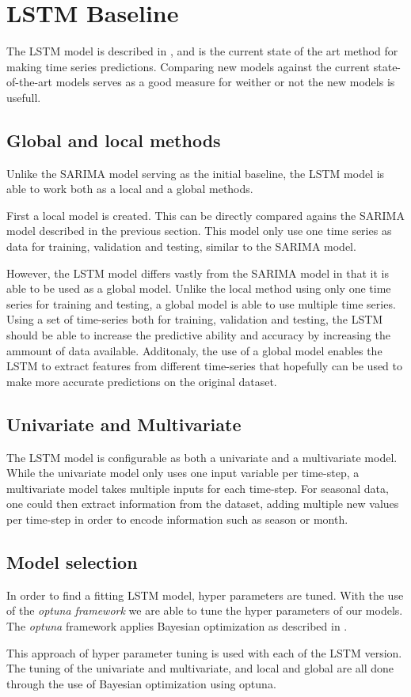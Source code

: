 
\section{LSTM Baseline}
\label{section:Architecture:Baselines:LSTM}

The LSTM model is described in , and is the current state of the art method for making time series predictions.
Comparing new models against the current state-of-the-art models serves as a good measure for weither or not the new models is usefull.

\subsection{Global and local methods}
Unlike the SARIMA model serving as the initial baseline,
the LSTM model is able to work both as a local and a global methods.

First a local model is created. This can be directly compared agains the SARIMA model described in the previous section.
This model only use one time series as data for training, validation and testing, similar to the SARIMA model.

However, the LSTM model differs vastly from the SARIMA model in that it is able to be used as a global model.
Unlike the local method using only one time series for training and testing,
a global model is able to use multiple time series.
Using a set of time-series both for training, validation and testing,
the LSTM should be able to increase the predictive ability and accuracy by increasing the ammount of data available.
Additonaly, the use of a global model enables the LSTM to extract features from different time-series that hopefully can be used to make more accurate predictions on the original dataset.

\subsection{Univariate and Multivariate}
The LSTM model is configurable as both a univariate and a multivariate model.
While the univariate model only uses one input variable per time-step, a multivariate model takes multiple inputs for each time-step.
For seasonal data, one could then extract information from the dataset, adding multiple new values per time-step in order to encode information such as season or month.

\subsection{Model selection}
In order to find a fitting LSTM model, hyper parameters are tuned.
With the use of the \textit{optuna framework} %
we are able to tune the hyper parameters of our models.
The \textit{optuna} framework applies Bayesian optimization as described in .

This approach of hyper parameter tuning is used with each of the LSTM version.
The tuning of the univariate and multivariate, and local and global are all done through the use of Bayesian optimization using optuna.


